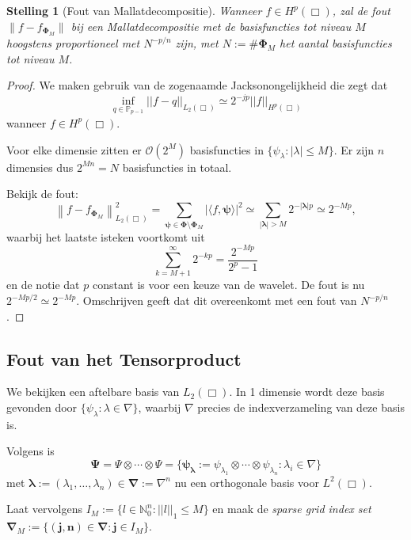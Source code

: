 \documentclass[11pt]{uvamath}
\newcommand{\N}{\mathbb{N}}
\theoremstyle{plain}
\newtheorem{stelling}{Stelling}[chapter]
\theoremstyle{definition}
\theoremstyle{remark}
\begin{document}
\begin{stelling}[Fout van Mallatdecompositie]
Wanneer $f \in H^p(\Box)$, zal de fout $\| f - f_{\mathcal{\boldsymbol\Phi}_M} \|$ bij een Mallatdecompositie met de basisfuncties tot niveau $M$ hoogstens proportioneel met $N^{-p/n}$ zijn, met $N := \# \boldsymbol\Phi_M$ het aantal basisfuncties tot niveau $M$.
\end{stelling}
\begin{proof}

  We maken gebruik van de zogenaamde Jacksonongelijkheid \cite{jackson} die zegt dat 
  \[
  \inf_{q \in \mathbb{P}_{p-1}} ||f - q||_{L_2(\Box)} \simeq 2^{-jp} ||f||_{H^p(\Box)}
  \]
  wanneer $f \in H^p(\Box)$.

  Voor elke dimensie zitten er $\mathcal{O}(2^M)$ basisfuncties in $\{ \psi_\lambda: |\lambda| \leq M \}$. Er zijn $n$ dimensies dus $2^{Mn} = N$ basisfuncties in totaal.

  Bekijk de fout:
  \[
  \left\| f - f_{\boldsymbol\Phi_M} \right\|^2_{L_2(\Box)} = \sum_{{\boldsymbol\psi} \in \boldsymbol\Phi \setminus \boldsymbol\Phi_M} | \langle f, \boldsymbol\psi \rangle |^2 \simeq \sum_{|\boldsymbol\lambda| > M} 2^{-|\boldsymbol\lambda|p} \simeq 2^{-Mp},
  \]
  waarbij het laatste isteken voortkomt uit
  \[
  \sum_{k=M+1}^\infty 2^{- kp} = \frac{2^{-Mp}}{2^p-1}
  \]
  en de notie dat $p$ constant is voor een keuze van de wavelet. De fout is nu $2^{-Mp/2} \simeq 2^{-Mp}$. Omschrijven geeft dat dit overeenkomt met een fout van $N^{-p/n}$.
\end{proof}

\subsection{Fout van het Tensorproduct}
We bekijken een aftelbare basis van $L_2(\Box)$. In 1 dimensie wordt deze basis gevonden door $\{ \psi_\lambda: \lambda \in \nabla \}$, waarbij $\nabla$ precies de indexverzameling van deze basis is.

Volgens \cite[L3.1.7]{tammo} is 
\[ 
  \boldsymbol\Psi = \Psi \otimes \cdots \otimes \Psi = \{ \boldsymbol{\psi_\lambda} := \psi_{\lambda_1} \otimes \cdots \otimes \psi_{\lambda_n}: \lambda_i \in \nabla \}
\]
met $\boldsymbol\lambda := (\lambda_1, \ldots, \lambda_n) \in \boldsymbol{\nabla} := \nabla^n$ nu een orthogonale basis voor $L^2(\Box)$.

Laat vervolgens $I_M := \{ l \in \N^n_0: ||l||_1 \leq M \}$ en maak de \emph{sparse grid index set} $\boldsymbol{\nabla}_M := \{ \boldsymbol{(j,n)} \in \boldsymbol{\nabla}: \boldsymbol{j} \in I_M \}$.
\end{document}
